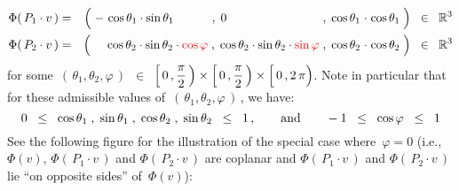 \begin{eqnarray*}
\Phi(\,P_{1}\cdot v\,)
& = &
	\left(\;
		-\,\cos\theta_{1}\cdot\sin\theta_{1}{\color{white}\cdot\cos\varphi.}
		\; , \;
		0{\color{white}\cos\theta_{1}\cdot\sin\theta_{1}........}
		\; , \;
		\cos\theta_{1}\overset{{\color{white}1}}{\cdot}\cos\theta_{1}
		\;\right)
	\;\;\in\;\; \Re^{3}
\\
\Phi(\,P_{2}\cdot v\,)
& = &
	\left(\;
		{\color{white}-}\,\cos\theta_{2}\cdot\sin\theta_{2}\cdot{\color{red}\cos\varphi}
		\; , \;
		\cos\theta_{2}\cdot\sin\theta_{2}\cdot{\color{red}\sin\varphi}
		\; , \;
		\cos\theta_{2}\overset{{\color{white}1}}{\cdot}\cos\theta_{2}
		\;\right)
	\;\;\in\;\; \Re^{3}
\end{eqnarray*}
for some \,$(\,\theta_{1}, \theta_{2},\varphi\,)$ \,$\in$\,
$\left[\,0\,,\dfrac{\pi}{2}\,\right) \times \left[\,0\,,\dfrac{\pi}{2}\,\right) \times \left[\,0\,,\overset{{\color{white}.}}{2\,\pi}\right)$.
Note in particular that for these admissible values of \,$(\,\theta_{1}, \theta_{2},\varphi\,)$\,, we have:
\begin{equation}\label{sineCosineRestrictions}
0
\;\; \leq \;\;
	\cos\theta_{1} \; , \; \sin\theta_{1} \; , \; \cos\theta_{2} \; , \; \sin\theta_{2}
\;\; \leq \;\;
	1\,,
\quad\quad\textnormal{and}\quad\quad
-1
\;\; \leq \;\;
	\cos\varphi
\;\; \leq \;\;
	1
\end{equation}
\vskip 0.5cm
\noindent
See the following figure for the illustration of the special case where \,$\varphi = 0$
(i.e., $\Phi(v)$, $\Phi(\,P_{1}\cdot v\,)$ and $\Phi(\,P_{2}\cdot v\,)$ are coplanar and
$\Phi(\,P_{1}\cdot v\,)$ and $\Phi(\,P_{2}\cdot v\,)$ lie ``on opposite sides'' of \,$\Phi(v)$):
